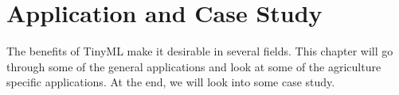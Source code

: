 \documentclass[../main]{subfiles}
\begin{document}
\chapter{Application and Case Study} \label{chp:}

The benefits of TinyML make it desirable in several fields. This chapter will
go through some of the general applications and look at some of the agriculture
specific applications. At the end, we will look into some case study.










\end{document}
